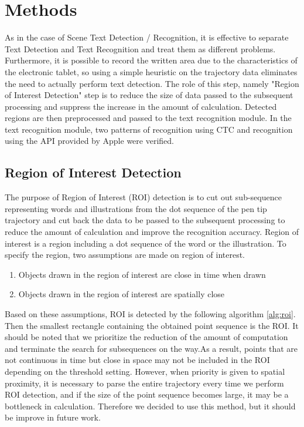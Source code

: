 \section{Methods}
\label{section:methods}

As in the case of Scene Text Detection / Recognition, it is effective to separate Text Detection
and Text Recognition and treat them as different problems.
Furthermore, it is possible to record the written area due to the characteristics of the electronic tablet,
so using a simple heuristic on the trajectory data eliminates the need to actually perform text detection.
The role of this step, namely "Region of Interest Detection" step is to reduce the size of data
passed to the subsequent processing and suppress the increase in the amount of calculation.
Detected regions are then preprocessed and passed to the text recognition module. In the text recognition module,
two patterns of recognition using CTC and recognition using the API provided by Apple were verified.

\subsection{Region of Interest Detection}

The purpose of Region of Interest (ROI) detection is to cut out sub-sequence
representing words and illustrations from the dot sequence of the pen tip trajectory
and cut back the data to be passed to the subsequent processing to
reduce the amount of calculation and improve the recognition accuracy.
Region of interest is a region including a dot sequence of the word or the illustration.
To specify the region, two assumptions are made on region of interest.

\begin{enumerate}
    \item Objects drawn in the region of interest are close in time when drawn
    \item Objects drawn in the region of interest are spatially close
\end{enumerate}

Based on these assumptions, ROI is detected by the following algorithm \ref{alg:roi}.
Then the smallest rectangle containing the obtained point sequence is the ROI.
It should be noted that we prioritize the reduction of the amount of computation and
terminate the search for subsequences on the way.As a result, points that are not continuous
in time but close in space may not be included in the ROI depending on the threshold setting.
However, when priority is given to spatial proximity, it is necessary to parse the entire
trajectory every time we perform ROI detection, and if the size of the point sequence becomes large,
it may be a bottleneck in calculation. Therefore we decided to use this method, but it should
be improve in future work.

